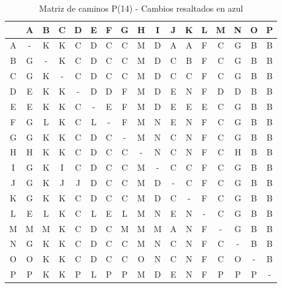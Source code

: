 \documentclass[12pt]{article}
\begin{document}
\begin{table}[h!]
\centering
\begin{tabular}{|c|c|c|c|c|c|c|c|c|c|c|c|c|c|c|c|c|}
\hline
 & A & B & C & D & E & F & G & H & I & J & K & L & M & N & O & P \\\hline
A & - & K & K & C & D & C & C & M & D & A & A & F & C & G & B & B \\\hline
B & G & - & K & C & D & C & C & M & D & C & B & F & C & G & B & B \\\hline
C & G & K & - & C & D & C & C & M & D & C & C & F & C & G & B & B \\\hline
D & E & \cellcolor{lightblue} K & K & - & D & D & F & M & D & E & \cellcolor{lightblue} N & F & D & D & B & B \\\hline
E & E & K & K & C & - & E & F & M & D & E & E & E & C & G & B & B \\\hline
F & G & L & K & C & L & - & F & M & \cellcolor{lightblue} N & E & \cellcolor{lightblue} N & F & C & G & B & B \\\hline
G & G & K & K & C & D & C & - & M & \cellcolor{lightblue} N & \cellcolor{lightblue} C & \cellcolor{lightblue} N & F & C & G & B & B \\\hline
H & H & K & K & C & \cellcolor{lightblue} D & C & C & - & \cellcolor{lightblue} N & \cellcolor{lightblue} C & \cellcolor{lightblue} N & \cellcolor{lightblue} F & C & H & B & B \\\hline
I & G & K & I & C & D & C & C & M & - & C & C & F & C & G & B & B \\\hline
J & G & K & J & J & D & C & C & M & D & - & C & F & C & G & B & B \\\hline
K & G & K & K & C & D & C & C & M & D & C & - & F & C & G & B & B \\\hline
L & E & L & K & C & L & E & L & M & \cellcolor{lightblue} N & E & \cellcolor{lightblue} N & - & C & G & B & B \\\hline
M & M & M & K & C & D & C & M & M & M & A & \cellcolor{lightblue} N & F & - & G & B & B \\\hline
N & G & K & K & C & D & C & C & M & N & C & N & F & C & - & B & B \\\hline
O & O & K & K & C & D & C & C & O & \cellcolor{lightblue} N & \cellcolor{lightblue} C & \cellcolor{lightblue} N & \cellcolor{lightblue} F & C & O & - & B \\\hline
P & P & \cellcolor{lightblue} K & \cellcolor{lightblue} K & P & L & P & P & M & D & E & \cellcolor{lightblue} N & F & P & P & P & - \\\hline
\end{tabular}
\caption{Matriz de caminos P(14) - Cambios resaltados en azul}
\end{table}
\end{document}
